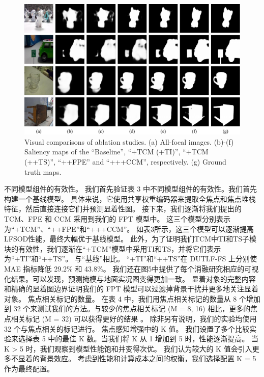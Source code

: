 \begin{figure}[t] 
	
	\includegraphics[width=0.99\linewidth]{figures/chapter3/self-comparsion-Use} 
	\centering
	
	
	\caption{   	Visual comparisons of ablation studies.      (a) All-focal images.      
		(b)-(f) Saliency maps of the ``Baseline'', ``+TCM (+TI)'', ``+TCM (++TS)'', ``++FPE'' and ``+++CCM'', respectively.
		(g) Ground truth maps.
	}  
	\label{figure:self-comp}
	
	\vspace{-0.2cm}
\end{figure}




不同模型组件的有效性。 我们首先验证表 3 中不同模型组件的有效性。我们首先构建一个基线模型。 具体来说，它使用共享权重编码器来提取全焦点和焦点堆栈特征，然后直接连接它们并预测显着性图。 接下来，我们逐渐将我们提出的 TCM、FPE 和 CCM 采用到我们的 FPT 模型中。 这三个模型分别表示为“+TCM”、“++FPE”和“+++CCM”。 如表3所示，这三个模型可以逐渐提高LFSOD性能，最终大幅优于基线模型。 此外，为了证明我们TCM中TI和TS子模块的有效性，我们逐渐在“+TCM”模型中采用TI和TS，并将它们表示为“+TI”和“++TS”。 与“基线”相比。 “+TI”和“++TS”在 DUTLF-FS 上分别使 MAE 指标降低 29.2\% 和 43.8\%。 我们还在图5中提供了每个消融研究相应的可视化结果。可以发现，预测掩模与地面实况图变得更加一致。 显着对象的完整内容和精确的显着图边界证明我们的 FPT 模型可以过滤掉背景干扰并更多地关注显着对象。 焦点相关标记的数量。 在表 4 中，我们用焦点相关标记的数量从 8 个增加到 32 个来测试我们的方法。与较少的焦点相关标记 (M = 8, 16) 相比，更多的焦点相关标记 (M = 32) 可以获得更好的结果 。 除非另有说明，我们的实验均使用 32 个与焦点相关的标记进行。 焦点感知增强中的 K 值。 我们设置了多个比较实验来选择表 5 中的最佳 K 数。当我们将 K 从 1 增加到 5 时，性能逐渐提高。 当 K > 5 时，我们观察到模型性能饱和并变得次优。 我们认为较大的 K 值会引入更多不显着的背景效应。 考虑到性能和计算成本之间的权衡，我们选择配置 K = 5 作为最终配置。

